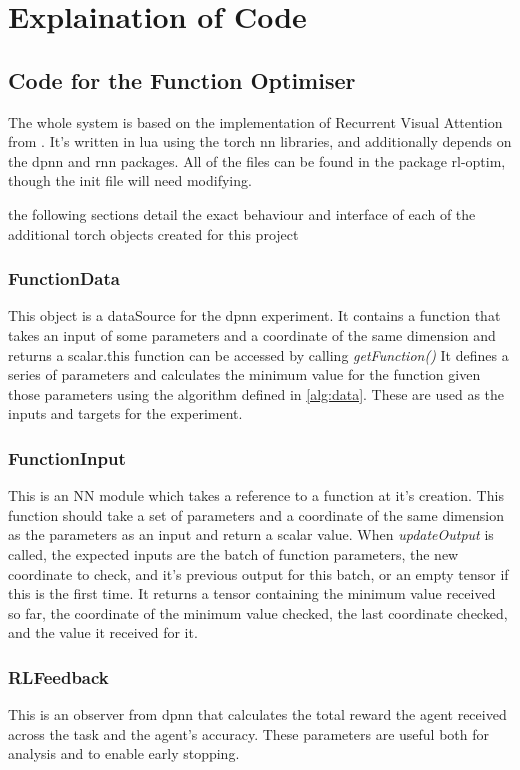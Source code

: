 \appendix

\section{Explaination of Code}

\subsection{Code for the Function Optimiser}
The whole system is based on the implementation of Recurrent Visual Attention from \cite{Torch:RVA}. It's written in lua using the torch nn libraries, and additionally depends on the dpnn and rnn packages. All of the files can be found in the package rl-optim, though the init file will need modifying.

the following sections detail the exact behaviour and interface of each of the additional torch objects created for this project
\subsubsection{FunctionData}
This object is a dataSource for the dpnn experiment. It contains a function that takes an input of some parameters and a coordinate of the same dimension and returns a scalar.this function can be accessed by calling \emph{getFunction()} It defines a series of parameters and calculates the minimum value for the function given those parameters using the algorithm defined in \ref{alg:data}. These are used as the inputs and targets for the experiment.

\subsubsection{FunctionInput}
This is an NN module which takes a reference to a function at it's creation. This function should take a set of parameters and a coordinate of the same dimension as the parameters as an input and return a scalar value. When \emph{updateOutput} is called, the expected inputs are the batch of function parameters, the new coordinate to check, and it's previous output for this batch, or an empty tensor if this is the first time. It returns a tensor containing the minimum value received so far, the coordinate of the minimum value checked, the last coordinate checked, and the value it received for it. 
\subsubsection{RLFeedback}
This is an observer from dpnn that calculates the total reward the agent received across the task and the agent's accuracy. These parameters are useful both for analysis and to enable early stopping.
